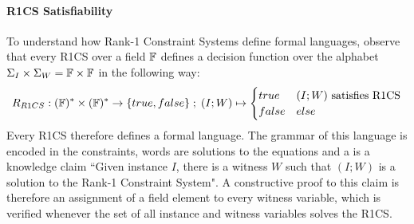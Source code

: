 \paragraph{R1CS Satisfiability}To understand how Rank-1 Constraint Systems define formal languages, observe that every R1CS over a field $\mathbb{F}$ defines a decision function over the alphabet $\Sigma_I \times \Sigma_W = \mathbb{F} \times \mathbb{F}$ in the following way:
\begin{equation}
R_{R1CS} : (\mathbb{F})^* \times (\mathbb{F})^* \to \{true, false\}\;;\;
(I;W) \mapsto
\begin{cases}
true & (I;W) \text{ satisfies R1CS}\\
false & else
\end{cases}
\end{equation}
Every R1CS therefore defines a formal language. The grammar of this language is encoded in the constraints, words are solutions to the equations and  a  is a knowledge claim ``Given instance $I$, there is a witness $W$ such that $(I;W)$ is a solution to the Rank-1 Constraint System". A constructive proof to this claim is therefore an assignment of a field element to every witness variable, which is verified whenever the set of all instance and witness variables solves the R1CS. 

